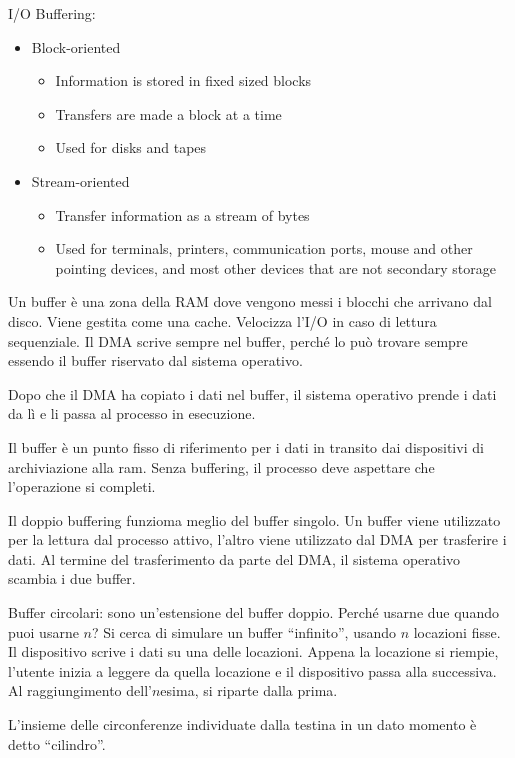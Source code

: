 I/O Buffering:
\begin{itemize}
  \item Block-oriented
  \begin{itemize}
    \item Information is stored in fixed sized blocks
    \item Transfers are made a block at a time
    \item Used for disks and tapes
  \end{itemize}
  \item Stream-oriented
  \begin{itemize}
    \item Transfer information as a stream of bytes
    \item Used for terminals, printers, communication ports, mouse and other pointing devices, and most other devices that are not secondary storage
  \end{itemize}
\end{itemize}

Un buffer \`e una zona della RAM dove vengono messi i blocchi che arrivano dal disco. Viene gestita come una cache. Velocizza l'I/O in caso di lettura sequenziale. Il DMA scrive sempre nel buffer, perch\'e lo pu\`o trovare sempre essendo il buffer riservato dal sistema operativo.

Dopo che il DMA ha copiato i dati nel buffer, il sistema operativo prende i dati da l\`i e li passa al processo in esecuzione.

Il buffer \`e un punto fisso di riferimento per i dati in transito dai dispositivi di archiviazione alla ram. Senza buffering, il processo deve aspettare che l'operazione si completi.

Il doppio buffering funzioma meglio del buffer singolo. Un buffer viene utilizzato per la lettura dal processo attivo, l'altro viene utilizzato dal DMA per trasferire i dati. Al termine del trasferimento da parte del DMA, il sistema operativo scambia i due buffer.

Buffer circolari: sono un'estensione del buffer doppio. Perch\'e usarne due quando puoi usarne $n$? Si cerca di simulare un buffer ``infinito'', usando $n$ locazioni fisse. Il dispositivo scrive i dati su una delle locazioni. Appena la locazione si riempie, l'utente inizia a leggere da quella locazione e il dispositivo passa alla successiva. Al raggiungimento dell'$n$esima, si riparte dalla prima.

L'insieme delle circonferenze individuate dalla testina in un dato momento \`e detto ``cilindro''.

